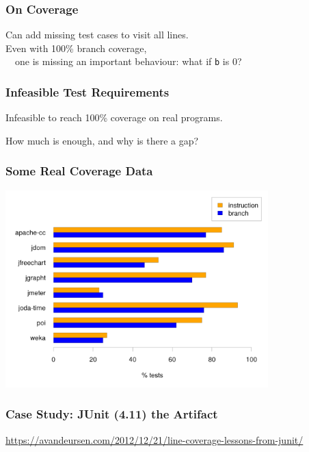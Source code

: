 \documentclass{beamer}
\newenvironment{changemargin}[1]{%
  \begin{list}{}{%
    \setlength{\topsep}{0pt}%
    \setlength{\leftmargin}{#1}%
    \setlength{\rightmargin}{1em}
    \setlength{\listparindent}{\parindent}%
    \setlength{\itemindent}{\parindent}%
    \setlength{\parsep}{\parskip}%
  }%
  \item[]}{\end{list}}
\begin{document}
\begin{frame}
  \frametitle{On Coverage}
  \begin{changemargin}{2em}
    Can add missing test cases to visit all lines.\\[1em]

    Even with 100\% branch coverage, \\
    ~~one is missing an important behaviour: what if \texttt{b} is 0?
  \end{changemargin}
\end{frame}



\usebackgroundtemplate{}

\begin{frame}
  \frametitle{Infeasible Test Requirements}
  \begin{changemargin}{2em}
    Infeasible to reach 100\% coverage on real programs.

    How much is enough, and why is there a gap?
  \end{changemargin}
\end{frame}


\begin{frame}
  \frametitle{Some Real Coverage Data}
\begin{center}
  \includegraphics[height=3in]{L03/coverage.png}
\end{center}
\end{frame}

\begin{frame}
  \frametitle{Case Study: JUnit (4.11) the Artifact}
  \Large
\begin{center}
  \url{https://avandeursen.com/2012/12/21/line-coverage-lessons-from-junit/}
\end{center}
\end{frame}
\end{document}
